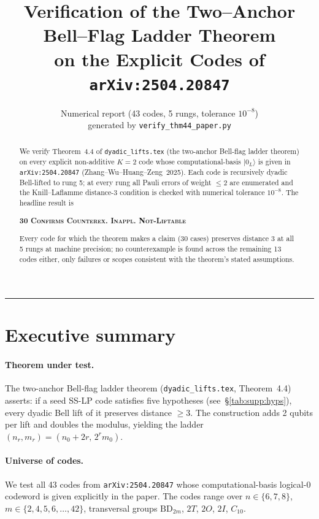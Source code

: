 \documentclass[11pt]{article}
\title{\bfseries Verification of the Two--Anchor Bell--Flag Ladder Theorem\\
  on the Explicit Codes of \texttt{arXiv:2504.20847}}
\author{Numerical report (43 codes, 5 rungs, tolerance $10^{-8}$)\\
  generated by \texttt{verify\_thm44\_paper.py}}
\date{}
\newcommand{\vCONF}{\textcolor{cConfirm}{\textsc{Confirms}}}
\newcommand{\vINAP}{\textcolor{cInapp}{\textsc{Inappl.}}}
\newcommand{\vLIFT}{\textcolor{cLift}{\textsc{Not-Liftable}}}
\newcommand{\vCNTR}{\textcolor{cCounter}{\textsc{Counterex.}}}
\begin{document}
\maketitle

\begin{abstract}
\noindent
We verify Theorem~4.4 of \texttt{dyadic\_lifts.tex} (the two-anchor Bell-flag
ladder theorem) on every explicit non-additive $K=2$ code whose
computational-basis $|0_L\rangle$ is given in \texttt{arXiv:2504.20847}
(Zhang--Wu--Huang--Zeng~2025). Each code is recursively dyadic Bell-lifted to
rung 5; at every rung all Pauli errors of weight $\le 2$ are enumerated and the
Knill--Laflamme distance-3 condition is checked with numerical tolerance
$10^{-8}$. The headline result is

\smallskip
\centerline{\textbf{30 \vCONF{} \; \vCNTR{} \; \vINAP{} \; \vLIFT{}}}\smallskip

\noindent
Every code for which the theorem makes a claim (30 cases) preserves distance 3
at all 5 rungs at machine precision; no counterexample is found across the
remaining 13 codes either, only failures or scopes consistent with the
theorem's stated assumptions.
\end{abstract}

\tableofcontents

\bigskip
\hrule

\section{Executive summary}
\label{sec:summary}

\paragraph{Theorem under test.}
The two-anchor Bell-flag ladder theorem (\texttt{dyadic\_lifts.tex},
Theorem~4.4) asserts: if a seed SS-LP code satisfies five hypotheses
(see~\S\ref{tab:supp:hyps}), every dyadic Bell lift of it preserves distance
$\ge 3$. The construction adds 2 qubits per lift and doubles the modulus,
yielding the ladder $(n_r, m_r) = (n_0+2r,\, 2^r m_0)$.

\paragraph{Universe of codes.}
We test all 43 codes from \texttt{arXiv:2504.20847} whose
computational-basis logical-$0$ codeword is given explicitly in the paper. The
codes range over $n\in\{6,7,8\}$, $m\in\{2,4,5,6,\ldots,42\}$, transversal
groups $\mathrm{BD}_{2m}$, $2T$, $2O$, $2I$, $C_{10}$.
\end{document}
